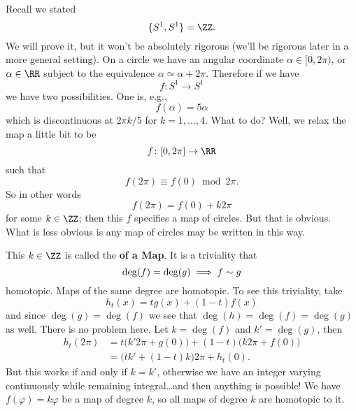 Recall we stated
\begin{equation}
\homotopyClass(S^{1},S^{1})=\ZZ.
\end{equation}
We will prove it, but it won't be absolutely rigorous (we'll be
rigorous later in a more general setting). On a circle we have an
angular coordinate $\alpha\in[0,2\pi)$, or $\alpha\in\RR$ subject
to the equivalence $\alpha\simeq\alpha+2\pi$. Therefore if we
have
\begin{equation}
f\colon S^1\to S^1
\end{equation}
we have two possibilities. One is, e.g.,
\begin{equation}
f(\alpha)=5\alpha
\end{equation}
which is discontinuous at $2\pi k/5$ for $k=1,\dots,4$. What to
do? Well, we relax the map a little bit to be
\begin{equation}
f\colon[0,2\pi]\to\RR
\end{equation}
such that
\begin{equation}
f(2\pi)\equiv f(0)\bmod 2\pi.
\end{equation}
So in other words
\begin{equation}
f(2\pi) = f(0) + k2\pi
\end{equation}
for some $k\in\ZZ$; then this $f$ specifies a map of circles. But
that is obvious. What is less obvious is any map of circles may
be written in this way.

This $k\in\ZZ$ is called the 
\textbf{of a Map}. It is a triviality that
\begin{equation}
\deg(f)=\deg(g)\implies f\sim g
\end{equation}
homotopic. Maps of the same degree are homotopic. To see this
triviality, take
\begin{equation}
h_{t}(x)=tg(x)+(1-t)f(x)
\end{equation}
and since $\deg(g)=\deg(f)$ we see that $\deg(h)=\deg(f)=\deg(g)$
as well. There is no problem here. Let $k=\deg(f)$ and
$k'=\deg(g)$, then
\begin{equation}
\begin{split}
h_{t}(2\pi) &= t\bigl(k'2\pi+g(0)\bigr)+(1-t)\bigl(k2\pi+f(0)\bigr)\\
&= \bigl(tk'+(1-t)k\bigr)2\pi + h_{t}(0).
\end{split}
\end{equation}
But this works if and only if $k=k'$, otherwise we have an
integer varying continuously while remaining integral\dots and
then anything is possible! We have $f(\varphi)=k\varphi$ be a map
of degree $k$, so all maps of degree $k$ are homotopic to it.

